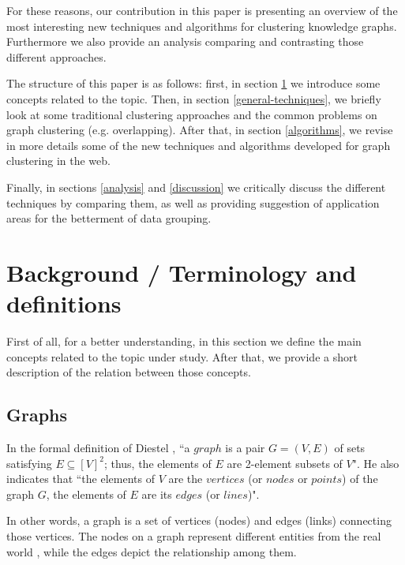 \documentclass[runningheads]{llncs}
\begin{document}
For these reasons, our contribution in this paper is presenting an overview of the most interesting new techniques and algorithms for clustering knowledge graphs. Furthermore we also provide an analysis comparing and contrasting those different approaches.

The structure of this paper is as follows: first, in section \ref{background} we introduce some concepts related to the topic. Then, in section \ref{general-techniques}, we briefly look at some traditional clustering approaches and the common problems on graph clustering (e.g. overlapping). After that, in section \ref{algorithms}, we revise in more details some of the new techniques and algorithms developed for graph clustering in the web.

Finally, in sections \ref{analysis} and \ref{discussion} we critically discuss the different techniques by comparing them, as well as providing suggestion of application areas for the betterment of data grouping. 


\section{Background / Terminology and definitions} \label{background}
First of all, for a better understanding, in this section we define the main concepts related to the topic under study. After that, we provide a short description of the relation between those concepts.


\subsection{Graphs} \label{graphs}
In the formal definition of Diestel \cite{Diestel}, ``a $graph$ is a pair $G = (V, E)$ of sets satisfying $E \subseteq [V]^2$; thus, the elements of $E$ are 2-element subsets of $V$". He also indicates that ``the elements of $V$ are the $vertices$ (or $nodes$ or $points$) of the graph $G$, the elements of $E$ are its $edges$ (or $lines$)".

In other words, a graph is a set of vertices (nodes) and edges (links) connecting those vertices. The nodes on a graph represent different entities from the real world \cite{Robinson}, while the edges depict the relationship among them.
\end{document}
